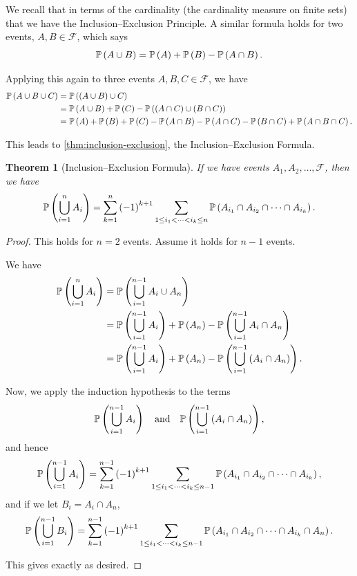 \documentclass{article}
\newtheorem{theorem}{Theorem}[section]
\theoremstyle{definition}
\theoremstyle{remark}
\newcommand{\Prob}{\mathbb{P}}
\newcommand{\eventSpace}{\mathcal{F}}
\newcommand{\qand}{\quad\text{and}\quad}
\begin{document}
We recall that in terms of the cardinality (the cardinality measure on finite sets) that we have the Inclusion--Exclusion Principle. A similar formula holds for two events, \(A, B \in \eventSpace\), which says
\[
    \Prob\pqty{A \cup B} = \Prob\pqty{A} + \Prob\pqty{B} - \Prob\pqty{A \cap B}.
\]

Applying this again to three events \(A, B, C \in \eventSpace\), we have
\begin{align*}
    \Prob\pqty{A \cup B \cup C} &=  \Prob\pqty{\pqty{A \cup B} \cup C}\\
    &= \Prob\pqty{A \cup B} + \Prob\pqty{C} - \Prob\pqty{\pqty{A \cap C} \cup \pqty{B \cap C}} \\
    &= \Prob\pqty{A} + \Prob\pqty{B} + \Prob\pqty{C} - \Prob\pqty{A \cap B} - \Prob\pqty{A \cap C} - \Prob\pqty{B \cap C} + \Prob\pqty{A \cap B \cap C}.
\end{align*}

This leads to \autoref{thm:inclusion-exclusion}, the Inclusion--Exclusion Formula.

\begin{theorem}[Inclusion--Exclusion Formula]
    \label{thm:inclusion-exclusion}%
    If we have events \(A_1, A_2, \ldots, \eventSpace\), then we have
    \[
        \Prob\pqty{\bigcup_{i = 1}^{n} A_i} = \sum_{k = 1}^{n} \pqty{-1}^{k + 1} \sum_{1 \leq i_1 < \cdots < i_k \leq n} \Prob\pqty{A_{i_1} \cap A_{i_2} \cap \cdots \cap A_{i_k}}.
    \]
\end{theorem}

\begin{proof}
    This holds for \(n = 2\) events. Assume it holds for \(n - 1\) events.

    We have
    \begin{align*}
        \Prob\pqty{\bigcup_{i = 1}^{n} A_i} &= \Prob\pqty{\bigcup_{i = 1}^{n - 1} A_i \cup A_n} \\
        &= \Prob\pqty{\bigcup_{i = 1}^{n - 1} A_i} + \Prob\pqty{A_n} - \Prob\pqty{\bigcup_{i = 1}^{n - 1} A_i \cap A_n} \\
        &= \Prob\pqty{\bigcup_{i = 1}^{n - 1} A_i} + \Prob\pqty{A_n} - \Prob\pqty{\bigcup_{i = 1}^{n - 1} \pqty{A_i \cap A_n}}.
    \end{align*}

    Now, we apply the induction hypothesis to the terms
    \[
        \Prob\pqty{\bigcup_{i = 1}^{n - 1} A_i} \qand \Prob\pqty{\bigcup_{i = 1}^{n - 1} \pqty{A_i \cap A_n}},
    \]
    and hence
    \[
        \Prob\pqty{\bigcup_{i = 1}^{n - 1} A_i} = \sum_{k = 1}^{n - 1} \pqty{-1}^{k + 1} \sum_{1 \leq i_1 < \cdots < i_k \leq n - 1} \Prob\pqty{A_{i_1} \cap A_{i_2} \cap \cdots \cap A_{i_k}},
    \]
    and if we let \(B_i = A_i \cap A_n\),
    \[
        \Prob\pqty{\bigcup_{i = 1}^{n - 1} B_i} = \sum_{k = 1}^{n - 1} \pqty{-1}^{k + 1} \sum_{1 \leq i_1 < \cdots < i_k \leq n - 1} \Prob\pqty{A_{i_1} \cap A_{i_2} \cap \cdots \cap A_{i_k} \cap A_n}.
    \]

    This gives exactly as desired.
\end{proof}
\end{document}
